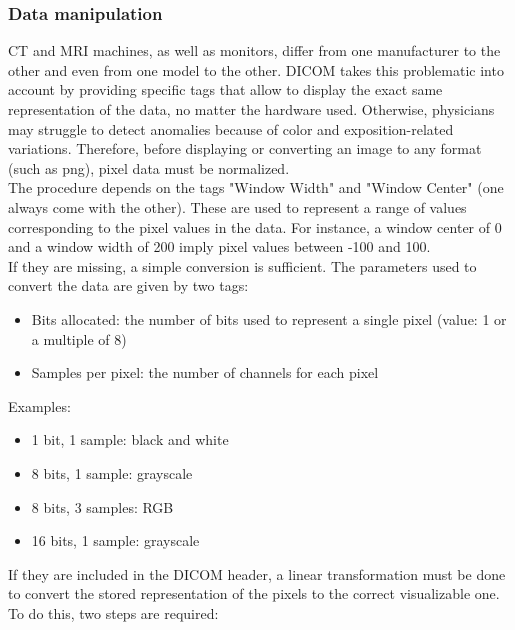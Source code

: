 \subsubsection{Data manipulation}
\label{sec:dicom_data_manipulation}
\setlength{\marginparwidth}{3cm}\leavevmode {}CT and MRI machines, as well as monitors, differ from one manufacturer to the other and even from one model to the other. DICOM takes this problematic into account by providing specific tags that allow to display the exact same representation of the data, no matter the hardware used. Otherwise, physicians may struggle to detect anomalies because of color and exposition-related variations. 
Therefore, before displaying or converting an image to any format (such as png), pixel data must be normalized.\\
The procedure depends on the tags "Window Width" and "Window Center" (one always come with the other). These are used to represent a range of values corresponding to the pixel values in the data. For instance, a window center of 0 and a window width of 200 imply pixel values between -100 and 100.\\
If they are missing, a simple conversion is sufficient. The parameters used to convert the data are given by two tags: 
\begin{itemize}
	\item Bits allocated: the number of bits used to represent a single pixel (value: 1 or a multiple of 8)
	\item Samples per pixel: the number of channels for each pixel

\end{itemize}
\newpage
\noindent Examples: 
\begin{itemize}
\item 1 bit, 1 sample: black and white
\item 8 bits, 1 sample: grayscale
\item 8 bits, 3 samples: RGB
\item 16 bits, 1 sample: grayscale

\end{itemize} 

\noindent If they are included in the DICOM header, a linear transformation must be done to convert the stored representation of the pixels to the correct visualizable one. To do this, two steps are required: 

